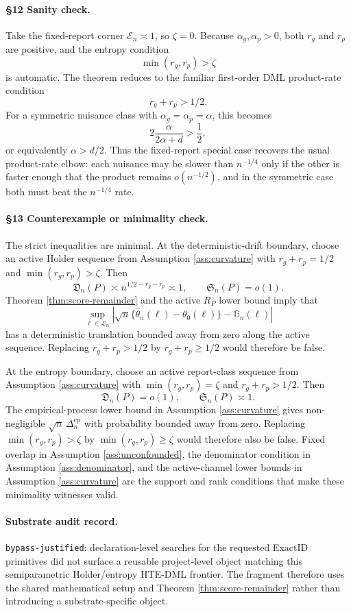 \paragraph{\S12 Sanity check.}
Take the fixed-report corner \(\mathcal{E}_n\asymp1\), so \(\zeta=0\).  Because
\(\alpha_g,\alpha_p>0\), both \(r_g\) and \(r_p\) are positive, and the entropy
condition
\[
\min(r_g,r_p)>\zeta
\]
is automatic.  The theorem reduces to the familiar first-order DML
product-rate condition
\[
r_g+r_p>1/2.
\]
For a symmetric nuisance class with \(\alpha_g=\alpha_p=\alpha\), this becomes
\[
2\frac{\alpha}{2\alpha+d}>\frac12,
\]
or equivalently \(\alpha>d/2\).  Thus the fixed-report special case recovers
the usual product-rate elbow: each nuisance may be slower than \(n^{-1/4}\)
only if the other is faster enough that the product remains \(o(n^{-1/2})\),
and in the symmetric case both must beat the \(n^{-1/4}\) rate.

\paragraph{\S13 Counterexample or minimality check.}
The strict inequalities are minimal.  At the deterministic-drift boundary,
choose an active Holder sequence from Assumption \ref{ass:curvature} with
\(r_g+r_p=1/2\) and \(\min(r_g,r_p)>\zeta\).  Then
\[
\mathfrak D_n(P)\asymp n^{1/2-r_g-r_p}\asymp1,
\qquad
\mathfrak S_n(P)=o(1).
\]
Theorem \ref{thm:score-remainder} and the active \(R_P\) lower bound imply
that
\[
\sup_{\ell\in\mathcal L_n}
\left|
\sqrt n\{\hat\theta_n(\ell)-\theta_0(\ell)\}-\mathbb G_n(\ell)
\right|
\]
has a deterministic translation bounded away from zero along the active
sequence.  Replacing \(r_g+r_p>1/2\) by \(r_g+r_p\ge1/2\) would therefore be
false.

At the entropy boundary, choose an active report-class sequence from
Assumption \ref{ass:curvature} with \(\min(r_g,r_p)=\zeta\) and
\(r_g+r_p>1/2\).  Then
\[
\mathfrak D_n(P)=o(1),
\qquad
\mathfrak S_n(P)\asymp1.
\]
The empirical-process lower bound in Assumption \ref{ass:curvature} gives
non-negligible \(\sqrt n\,\Delta_n^{\mathrm{ep}}\) with probability bounded
away from zero.  Replacing \(\min(r_g,r_p)>\zeta\) by
\(\min(r_g,r_p)\ge\zeta\) would therefore also be false.  Fixed overlap in
Assumption \ref{ass:unconfounded}, the denominator condition in Assumption
\ref{ass:denominator}, and the active-channel lower bounds in Assumption
\ref{ass:curvature} are the support and rank conditions that make these
minimality witnesses valid.

\paragraph{Substrate audit record.}
\texttt{bypass-justified}: declaration-level searches for the requested
ExactID primitives did not surface a reusable project-level object matching
this semiparametric Holder/entropy HTE-DML frontier.  The fragment therefore
uses the shared mathematical setup and Theorem \ref{thm:score-remainder}
rather than introducing a substrate-specific object.
